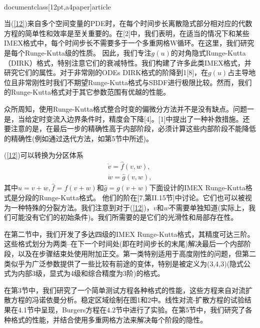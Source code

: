 \\documentclass[12pt,a4paper]{article}
\begin{document}
当(\ref{12})来自多个空间变量的PDE时，在每个时间步长离散隐式部分相对应的代数方程的简单性和效率是至关重要的。在[2]中，我们表明，在适当的情况下和某些IMEX格式中，每个时间步长不需要多于一个多重网格W循环。在这里，我们研究是每个Runge-Kutta级的性质。 因此，我们专注$g(u)$的对角隐式Runge-Kutta（DIRK）格式，特别注意它们的衰减特性。我们构建了许多此类IMEX格式，并研究它们的属性。对于非常刚的ODEs DIRK格式的阶降到1[8]，在$g(u)$占主导地位且非常刚性时我们不期望Runge-Kutta格式与SBDF进行极限比较。然而，我们的Runge-Kutta格式对于其它参数范围有优越的性能。

众所周知，使用Runge-Kutta格式整合时变的偏微分方法并不是没有缺点。问题一是，当给定时变流入边界条件时，精度会下降[4]。[1]中提出了一种补救措施。还要注意的是，在最后一步的精确性高于内部阶段，必须计算这些内部阶段不能降低的精确性(例如通过迭代方法，如第5节中所述)。

(\ref{12})可以转换为分区体系
\begin{gather*}
\dot{v}=\widehat{f}(v,w),
\label{131} \\
\dot{w}=\widehat{g}(v,w),
\label{132}
\end{gather*}
其中$u=v+w,\widehat{f}=f(v+w)$和$\widehat{g}=g(v+w)$下面设计的IMEX Runge-Kutta格式是分段的Runge-Kutta格式。 他们的阶在[7,第II.15节]中讨论。它们也可以被视为一种特殊的分裂方法。我们注意到对于(\ref{12})，$v$和$w$不需要单独知道(实际上，我们可能没有它们的初始条件)。我们所需要的是它们的光滑性和局部存在性。

在第二节中，我们开发了多达四级的IMEX Runge-Kutta格式，其精度可达三阶。这些格式划分为两类--在下一个时间处(即在时间步长的末尾)解决最后一个内部阶段，以及在步骤结束处使用附加正交。第一类特别适用于高度刚性的问题，但第二类似乎为广泛参数提供了一些比较有前途的变体，特别是被定义为(3,4,3)(隐式公式为内部3级，显式为4级和综合精度为3阶)的格式。

在第3节中，我们研究了一个简单测试方程各种格式的性能，这些方程来自对流扩散方程的冯诺依曼分析。稳定区域绘制在图1和2中。线性对流-扩散方程的试验结果在4.1节中呈现，Burgers方程在4.2节中进行了实验。在第5节中，我们研究了各种格式的性能，并结合使用多重网格方法来解决每个阶段的隐性。
\end{document}
